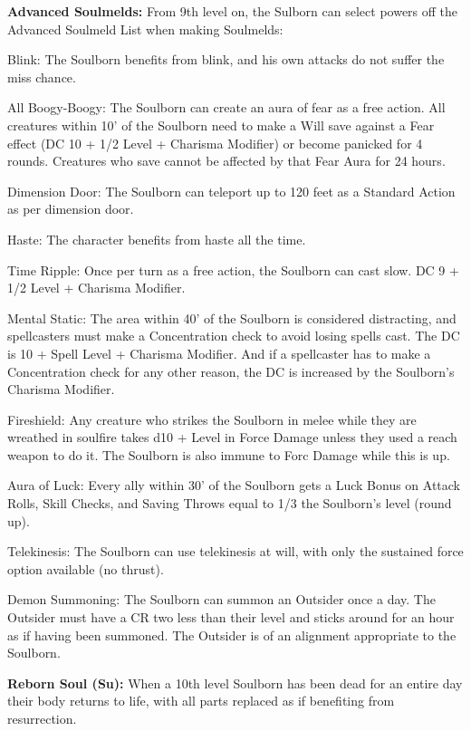 \textbf{Advanced Soulmelds:} From 9th level on, the Sulborn can select powers off the Advanced Soulmeld List when making Soulmelds: 
\begin{itemize*}
\item Blink: The Soulborn benefits from blink, and his own attacks do not suffer the miss chance. 
\item All Boogy-Boogy: The Soulborn can create an aura of fear as a free action. All creatures within 10' of the Soulborn need to make a Will save against a Fear effect (DC 10 + 1/2 Level + Charisma Modifier) or become panicked for 4 rounds. Creatures who save cannot be affected by that Fear Aura for 24 hours. 
\item Dimension Door: The Soulborn can teleport up to 120 feet as a Standard Action as per dimension door. 
\item Haste: The character benefits from haste all the time. 
\item Time Ripple: Once per turn as a free action, the Soulborn can cast slow. DC 9 + 1/2 Level + Charisma Modifier. 
\item Mental Static: The area within 40' of the Soulborn is considered distracting, and spellcasters must make a Concentration check to avoid losing spells cast. The DC is 10 + Spell Level + Charisma Modifier. And if a spellcaster has to make a Concentration check for any other reason, the DC is increased by the Soulborn's Charisma Modifier. 
\item Fireshield: Any creature who strikes the Soulborn in melee while they are wreathed in soulfire takes d10 + Level in Force Damage unless they used a reach weapon to do it. The Soulborn is also immune to Forc Damage while this is up. 
\item Aura of Luck: Every ally within 30' of the Soulborn gets a Luck Bonus on Attack Rolls, Skill Checks, and Saving Throws equal to 1/3 the Soulborn's level (round up). 
\item Telekinesis: The Soulborn can use telekinesis at will, with only the sustained force option available (no thrust). 
\item Demon Summoning: The Soulborn can summon an Outsider once a day. The Outsider must have a CR two less than their level and sticks around for an hour as if having been summoned. The Outsider is of an alignment appropriate to the Soulborn.
\end{itemize*}

\textbf{Reborn Soul (Su):} When a 10th level Soulborn has been dead for an entire day their body returns to life, with all parts replaced as if benefiting from resurrection. 

